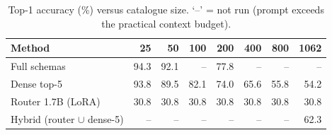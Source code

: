 \begin{table}[t]
\caption{Top-1 accuracy (\%) versus catalogue size. `--' = not run (prompt exceeds the practical context budget).}
\label{tab:scale}
\centering\footnotesize
\begin{tabular}{@{}lrrrrrrr@{}}
\toprule
Method & 25 & 50 & 100 & 200 & 400 & 800 & 1062 \\
\midrule
Full schemas & 94.3 & 92.1 & -- & 77.8 & -- & -- & -- \\
Dense top-5 & 93.8 & 89.5 & 82.1 & 74.0 & 65.6 & 55.8 & 54.2 \\
Router 1.7B (LoRA) & 30.8 & 30.8 & 30.8 & 30.8 & 30.8 & 30.8 & 30.8 \\
Hybrid (router $\cup$ dense-5) & -- & -- & -- & -- & -- & -- & 62.3 \\
\bottomrule
\end{tabular}
\end{table}
